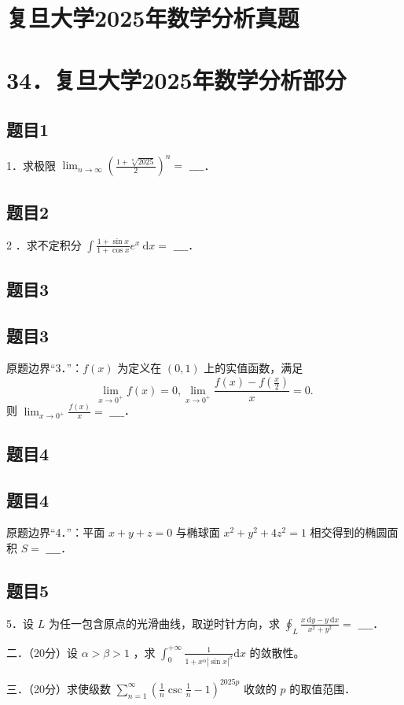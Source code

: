 \documentclass{article}
\begin{document}
\section*{复旦大学2025年数学分析真题}
\section*{34．复旦大学2025年数学分析部分}

\subsection{题目1}
1．求极限 \(\lim _{n \rightarrow \infty}\left(\frac{1+\sqrt[n]{2025}}{2}\right)^{n}=\) \(\_\_\_\_\)．

\subsection{题目2}
2 ．求不定积分 \(\int \frac{1+\sin x}{1+\cos x} e^{x} \mathrm{~d} x=\) \(\_\_\_\_\)．

\begin{itemize}

\subsection{题目3}
\end{itemize}

\subsection{题目3}
原题边界“3．”：\(f(x)\) 为定义在 \((0,1)\) 上的实值函数，满足
\[
\lim _{x \rightarrow 0^{+}} f(x)=0, \lim _{x \rightarrow 0^{+}} \frac{f(x)-f\left(\frac{x}{2}\right)}{x}=0 .
\]
则 \(\lim _{x \rightarrow 0^{+}} \frac{f(x)}{x}=\) \(\_\_\_\_\)．

\subsection{题目4}

\subsection{题目4}
原题边界“4．”：平面 \(x+y+z=0\) 与椭球面 \(x^{2}+y^{2}+4 z^{2}=1\) 相交得到的椭圆面积 \(S=\) \(\_\_\_\_\)．

\subsection{题目5}
5．设 \(L\) 为任一包含原点的光滑曲线，取逆时针方向，求 \(\oint_{L} \frac{x \mathrm{~d} y-y \mathrm{~d} x}{x^{2}+y^{2}}=\) \(\_\_\_\_\)．

二．（20分）设 \(\alpha>\beta>1\) ，求 \(\int_{0}^{+\infty} \frac{1}{1+x^{\alpha}|\sin x|^{\beta}} \mathrm{d} x\) 的敛散性。

三．（20分）求使级数 \(\sum_{n=1}^{\infty}\left(\frac{1}{n} \csc \frac{1}{n}-1\right)^{2025 p}\) 收敛的 \(p\) 的取值范围．
\end{document}
